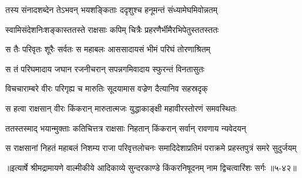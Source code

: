 \twolineshloka
{तस्य संनादशब्देन तेऽभवन् भयशङ्किताः}
{ददृशुश्च हनूमन्तं संध्यामेघमिवोन्नतम्} %

\twolineshloka
{स्वामिसंदेशनिःशङ्कास्ततस्ते राक्षसाः कपिम्}
{चित्रैः प्रहरणैर्भीमैरभिपेतुस्ततस्ततः} %

\twolineshloka
{स तैः परिवृतः शूरैः सर्वतः स महाबलः}
{आससादायसं भीमं परिघं तोरणाश्रितम्} %

\twolineshloka
{स तं परिघमादाय जघान रजनीचरान्}
{सपन्नगमिवादाय स्फुरन्तं विनतासुतः} %

\twolineshloka
{विचचाराम्बरे वीरः परिगृह्य च मारुतिः}
{सूदयामास वज्रेण दैत्यानिव सहस्रदृक्} %

\twolineshloka
{स हत्वा राक्षसान् वीरः किंकरान् मारुतात्मजः}
{युद्धाकाङ्क्षी महावीरस्तोरणं समवस्थितः} %

\twolineshloka
{ततस्तस्माद् भयान्मुक्ताः कतिचित्तत्र राक्षसाः}
{निहतान् किंकरान् सर्वान् रावणाय न्यवेदयन्} %

\twolineshloka
{स राक्षसानां निहतं महाबलं निशम्य राजा परिवृत्तलोचनः}
{समादिदेशाप्रतिमं पराक्रमे प्रहस्तपुत्रं समरे सुदुर्जयम्} %


॥इत्यार्षे श्रीमद्रामायणे वाल्मीकीये आदिकाव्ये सुन्दरकाण्डे किंकरनिषूदनम् नाम द्विचत्वारिंशः सर्गः ॥५-४२॥
